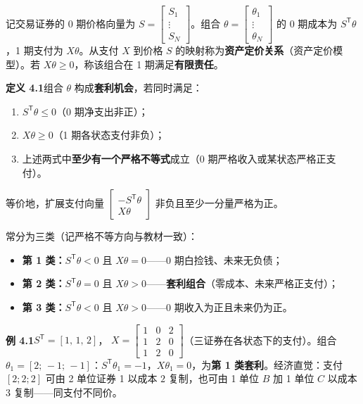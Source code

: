 \begin{tcolorbox}[knowledge,title=4.2 套利]
记交易证券的 0 期价格向量为 $S=\begin{bmatrix}S_1 \\ \vdots \\ S_N\end{bmatrix}$。组合 $\theta=\begin{bmatrix}\theta_1 \\ \vdots \\ \theta_N\end{bmatrix}$ 的 0 期成本为 $S^{\mathsf T}\theta$，1 期支付为 $X\theta$。从支付 $X$ 到价格 $S$ 的映射称为\textbf{资产定价关系}（资产定价模型）。若 $X\theta\ge 0$，称该组合在 1 期满足\textbf{有限责任}。

\begin{tcolorbox}[knowledge]
\textbf{定义 4.1}\quad 组合 $\theta$ 构成\textbf{套利机会}，若同时满足：
\begin{enumerate}
    \item $S^{\mathsf T}\theta\le 0$（0 期净支出非正）；
    \item $X\theta\ge 0$（1 期各状态支付非负）；
    \item 上述两式中\textbf{至少有一个严格不等式}成立（0 期严格收入或某状态严格正支付）。
\end{enumerate}
等价地，扩展支付向量 $\begin{bmatrix}-S^{\mathsf T}\theta \\ X\theta\end{bmatrix}$ 非负且至少一分量严格为正。
\end{tcolorbox}

常分为三类（记严格不等方向与教材一致）：
\begin{itemize}
    \item \textbf{第 1 类：}$S^{\mathsf T}\theta<0$ 且 $X\theta=0$——0 期白捡钱、未来无负债；
    \item \textbf{第 2 类：}$S^{\mathsf T}\theta=0$ 且 $X\theta>0$——\textbf{套利组合}（零成本、未来严格正支付）；
    \item \textbf{第 3 类：}$S^{\mathsf T}\theta<0$ 且 $X\theta>0$——0 期收入为正且未来仍为正。
\end{itemize}

\begin{tcolorbox}[example]
\textbf{例 4.1}\quad $S^{\mathsf T}=[1,\,1,\,2]$，
$X=\begin{bmatrix}1&0&2\\1&2&0\\1&2&0\end{bmatrix}$（三证券在各状态下的支付）。组合 $\theta_1=[2;\,-1;\,-1]$：$S^{\mathsf T}\theta_1=-1$，$X\theta_1=0$，为\textbf{第 1 类套利}。经济直觉：支付 $[2;2;2]$ 可由 2 单位证券 1 以成本 $2$ 复制，也可由 1 单位 $B$ 加 1 单位 $C$ 以成本 $3$ 复制——同支付不同价。
\end{tcolorbox}
\end{tcolorbox}

